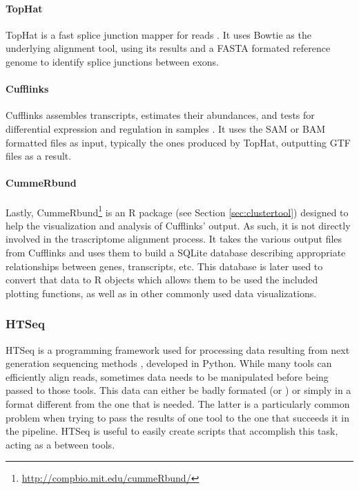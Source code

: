 \paragraph{TopHat}

TopHat is a fast splice junction mapper for \rnaseq{} reads
\cite{Trapnell01052009}. It uses Bowtie as the underlying alignment tool, using
its results and a FASTA formated reference genome to identify splice junctions
between exons.

\paragraph{Cufflinks}

Cufflinks assembles transcripts, estimates their abundances, and tests for
differential expression and regulation in \rnaseq{} samples
\cite{trapnell2010transcript}. It uses the SAM or BAM formatted files as input,
typically the ones produced by TopHat, outputting GTF files as a result.

\paragraph{CummeRbund}

Lastly, CummeRbund\footnote{\url{http://compbio.mit.edu/cummeRbund/}} is an R
package (see Section \ref{sec:clustertool}) designed to help the visualization and
analysis of Cufflinks' \rnaseq{} output. As such, it is not directly involved in
the trascriptome alignment process. It takes the various output files from
Cufflinks and uses them to build a SQLite database describing appropriate
relationships between genes, transcripts, etc. This database is later used to
convert that data to R objects which allows them to be used the included
plotting functions, as well as in other commonly used data visualizations.

\subsubsection*{HTSeq}

HTSeq is a programming framework used for processing data resulting from next
generation sequencing methods \cite{htseq}, developed in Python. While many
tools can efficiently align reads, sometimes data needs to be manipulated before
being passed to those tools. This data can either be badly formated (or
) or simply in a format different from the one that is needed. The
latter is a particularly common problem when trying to pass the results of one
tool to the one that succeeds it in the pipeline. HTSeq is useful to easily
create scripts that accomplish this task, acting as a  between tools.

